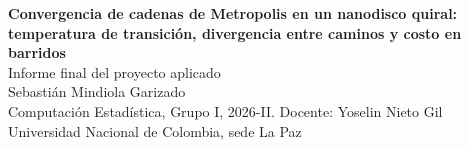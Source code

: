 \documentclass[11pt,a4paper]{article}
\begin{document}
\begin{center}
{\Large\bfseries\color{azulUNAL} Convergencia de cadenas de Metropolis en un nanodisco quiral:\\[2pt]
temperatura de transición, divergencia entre caminos y costo en barridos}\\[10pt]
{\normalsize Informe final del proyecto aplicado}\\[4pt]
{\small Sebastián Mindiola Garizado}\\[2pt]
{\small Computación Estadística, Grupo I, 2026-II. Docente: Yoselin Nieto Gil}\\[2pt]
{\small Universidad Nacional de Colombia, sede La Paz}
\end{center}












\appendix

\end{document}
